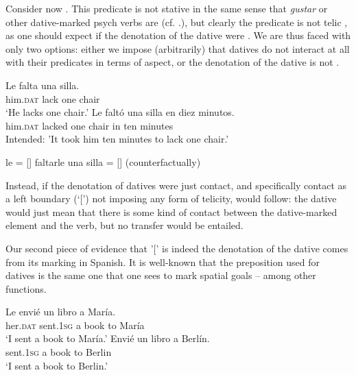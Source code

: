 \documentclass[output=paper,colorlinks,citecolor=brown,nonflat]{./langscibook}
\begin{document}
Consider now . This predicate is not stative in the same sense that \textit{gustar} or other dative-marked psych verbs are (cf. .), but clearly the predicate is not telic , as one should expect if the denotation of the dative  were . We are thus faced with only two options: either we impose (arbitrarily) that datives do not interact at all with their predicates in terms of aspect, or the denotation of the dative is not .

\ea%
    \label{ex:fabregas:19}
    \ea\label{ex:fabregas:19a}
    \gll    Le       falta   una silla.\\
            {him.}\textsc{dat}  {lack}  {one} {chair}\\
    \glt `He lacks one chair.' 
    \ex\label{ex:fabregas:19b}
    \gll    *Le           faltó     una silla  en diez minutos.\\
            him.\textsc{dat}    lacked  one chair in  ten  minutes\\
    \glt    Intended: 'It took him ten minutes to lack one chair.'
    \z
\z

\ea%
    \label{ex:fabregas:20}
    \ea\label{ex:fabregas:20a}
    le              =     [{\midline}]
    \ex\label{ex:fabregas:20b}
    faltarle una silla    =    [{\midline}] (counterfactually)
    \z
\z

Instead, if the denotation of datives were just contact, and specifically contact as a left boundary (‘[') not imposing any form of telicity,  would follow: the dative would just mean that there is some kind of contact between the dative-marked element and the verb, but no transfer would be entailed. 

Our second piece of evidence that '[' is indeed the denotation of the dative comes from its marking in Spanish. It is well-known that the preposition used for datives  is the same one that one sees to mark spatial goals  – among other functions.

\ea%
    \label{ex:fabregas:21}
    \ea\label{ex:fabregas:21a}
    \gll    Le     envié     un libro  a  María.\\
            {her.}\textsc{dat}  {sent.1}\textsc{sg}     {a}   {book} {to} {María}\\
    \glt `I sent a book to María.'
    \ex\label{ex:fabregas:21b}
    \gll    Envié     un libro a  Berlín.\\
            {sent.1}\textsc{sg}    {a}  {book} {to} {Berlin}\\
    \glt `I sent a book to Berlin.'
    \z
\z
\end{document}
